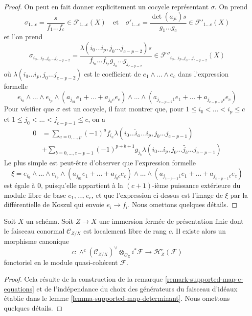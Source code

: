 \begin{proof}
On peut en fait donner explicitement un cocycle
représentant $\sigma$. On prend
$$
\sigma_{1 \ldots c} = \frac{s}{f_1 \ldots f_c} \in \mathcal{F}_{1 \ldots c}(X)
\quad\text{et}\quad
\sigma'_{1 \ldots c} = \frac{\det(a_{ji})s}{g_1 \ldots g_c} \in
\mathcal{F}'_{1 \ldots c}(X)
$$
et l'on prend
$$
\sigma_{i_0 \ldots i_p, j_0 \ldots j_{c - p - 2}} =
\frac{\lambda(i_0 \ldots i_p, j_0 \ldots j_{c - p - 2})s}%
{f_{i_0} \ldots f_{i_p}g_{j_0} \ldots g_{j_{c - p - 2}}}
\in \mathcal{F}''_{i_0 \ldots i_p, j_0 \ldots j_{c - p - 2}}(X)
$$
où $\lambda(i_0 \ldots i_p, j_0 \ldots j_{c - p - 2})$
est le coefficient de $e_1 \wedge \ldots \wedge e_c$ dans
l'expression formelle
$$
e_{i_0} \wedge \ldots \wedge e_{i_p} \wedge
(a_{j_01} e_1 + \ldots + a_{j_0c}e_c) \wedge \ldots \wedge
(a_{j_{c - p - 2}1} e_1 + \ldots + a_{j_{c - p - 2}c}e_c)
$$
Pour vérifier que $\sigma$ est un cocycle, il faut montrer que, pour
$1 \leq i_0 < \ldots < i_p \leq c$ et
$1 \leq j_0 < \ldots < j_{c - p - 1} \leq c$,
on a
\begin{align*}
0 & =
\sum\nolimits_{a = 0, \ldots, p} (-1)^a
f_{i_a} \lambda(i_0 \ldots \hat i_a \ldots i_p, j_0 \ldots j_{c - p - 1}) \\
& +
\sum\nolimits_{b = 0, \ldots, c - p - 1} (-1)^{p + b + 1}g_{j_b}
\lambda(i_0 \ldots i_p, j_0 \ldots \hat j_b \ldots j_{c - p - 1})
\end{align*}
Le plus simple est peut-être d'observer que l'expression formelle
$$
\xi = e_{i_0} \wedge \ldots \wedge e_{i_p} \wedge
(a_{j_01} e_1 + \ldots + a_{j_0c}e_c) \wedge \ldots \wedge
(a_{j_{c - p - 1}1} e_1 + \ldots + a_{j_{c - p - 1}c}e_c)
$$
est égale à $0$, puisqu'elle appartient à la $(c + 1)$-ième puissance extérieure du module libre
de base $e_1, \ldots, e_c$, et que l'expression ci-dessus est l'image de
$\xi$ par la différentielle de Koszul qui envoie $e_i \to f_i$. Nous omettons quelques
détails.
\end{proof}

\begin{lemma}
\label{lemma-supported-map-global}
Soit $X$ un schéma. Soit $Z \to X$ une immersion fermée de présentation finie
dont le faisceau conormal $\mathcal{C}_{Z/X}$ est localement libre de rang $c$.
Il existe alors un morphisme canonique
$$
c :
\wedge^c(\mathcal{C}_{Z/X})^\vee \otimes_{\mathcal{O}_Z} i^*\mathcal{F}
\longrightarrow
\mathcal{H}_Z^c(\mathcal{F})
$$
fonctoriel en le module quasi-cohérent $\mathcal{F}$.
\end{lemma}

\begin{proof}
Cela résulte de la construction de la
remarque \ref{remark-supported-map-c-equations}
et de l'indépendance du choix
des générateurs du faisceau d'idéaux établie dans le
lemme \ref{lemma-supported-map-determinant}.
Nous omettons quelques détails.
\end{proof}

